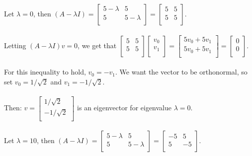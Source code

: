 \documentclass[11pt]{article}
\begin{document}
Let $\lambda = 0$, then $(A - \lambda I) = \begin{bmatrix}
5 - \lambda & 5 \\
5 & 5 - \lambda \\
\end{bmatrix} = \begin{bmatrix}
5 & 5 \\
5 & 5 \\
\end{bmatrix}$. \\\\
Letting $(A - \lambda I)v = 0$, we get that $ \begin{bmatrix}
5 & 5 \\
5 & 5 \\
\end{bmatrix} \begin{bmatrix}
v_0 \\
v_1 \\
\end{bmatrix} = \begin{bmatrix}
5v_0 + 5v_1 \\
5v_0 + 5v_1 \\
\end{bmatrix} = \begin{bmatrix}
0 \\
0 \\
\end{bmatrix} $. \\\\
For this inequality to hold, $v_0 = -v_1$. We want the vector to be orthonormal, so set $v_0 = 1 / \sqrt2$ and $v_1 = - 1 / \sqrt2.$ \\\\
Then: $v = \begin{bmatrix}
1 / \sqrt2 \\
- 1 / \sqrt2 \\
\end{bmatrix}$ is an eigenvector for eigenvalue $\lambda = 0$. \\\\
Let $\lambda = 10$, then $(A - \lambda I) = \begin{bmatrix}
5 - \lambda & 5 \\
5 & 5 - \lambda \\
\end{bmatrix} = \begin{bmatrix}
-5 & 5 \\
5 & -5 \\
\end{bmatrix}$. \\\\
\end{document}
